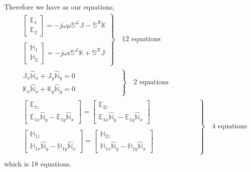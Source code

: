 \documentclass{article}
\renewcommand{\L}{\mathbf{\mathcal{L}}}
\newcommand{\R}{\mathbf{\mathcal{R}}}
\newcommand{\0}{\varnothing}
\newcommand{\Ev}{\mathbb{E}}
\newcommand{\Jv}{\mathbb{J}}
\newcommand{\Hv}{\mathbb{H}}
\newcommand{\Kv}{\mathbb{K}}
\newcommand{\SLm}{\mathbb{S}^\L}
\newcommand{\SRm}{\mathbb{S}^\R}
\newcommand{\N}{\mathbb{\hat N}}
\begin{document}
Therefore we have as our equations,
\begin{align*}
&\left.
    \begin{array}{c}
    \left[\begin{array}{c}\Ev_1\\\Ev_2\end{array}\right]
    = -j\omega\mu \SLm \Jv - \SRm \Kv\\\\
    \left[\begin{array}{c}\Hv_1\\\Hv_2\end{array}\right]
     = -j\omega\epsilon \SLm \Kv + \SRm \Jv
    \end{array}\right\} \quad \text{12 equations}\\
     &\left.
    \begin{array}{c}
    \Jv_x \N_x + \Jv_y \N_y  = 0 \\
    \Kv_x \N_x + \Kv_y \N_y = 0 
    \end{array}\quad \quad \quad \quad \quad \quad \right\} \quad \text{2 equations}\\
    & \left.
     \begin{array}{c}
    \left[
    \begin{array}{c}
        \Ev_{1z} \\
        \Ev_{1x} \N_y - \Ev_{1y} \N_x
    \end{array}
    \right] = 
       \left[
    \begin{array}{c}
        \Ev_{2z} \\
        \Ev_{1x} \N_y - \Ev_{1y} \N_x
    \end{array} \right] \\\\
    \left[
    \begin{array}{c}
        \Hv_{1z} \\
        \Hv_{1x} \N_y - \Hv_{1y} \N_x
    \end{array}
    \right] = 
       \left[
    \begin{array}{c}
        \Hv_{2z} \\
        \Hv_{1x} \N_y - \Hv_{1y} \N_x
    \end{array} \right] 
    \end{array}
    \quad \quad \quad \quad \quad \quad \right\} \quad \text{4 equations}\\
\end{align*}
which is 18 equations.
\end{document}
